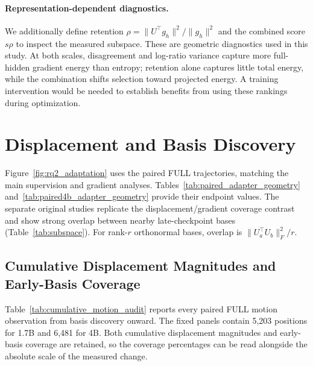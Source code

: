 \paragraph{Representation-dependent diagnostics.}
We additionally define retention $\rho=\|U^\top g_h\|^2/\|g_h\|^2$ and the combined score $s\rho$ to inspect the measured subspace. These are geometric diagnostics used in this study. At both scales, disagreement and log-ratio variance capture more full-hidden gradient energy than entropy; retention alone captures little total energy, while the combination shifts selection toward projected energy. A training intervention would be needed to establish benefits from using these rankings during optimization.




\FloatBarrier
\section{Displacement and Basis Discovery}
\label{app:displacement}
Figure~\ref{fig:rq2_adaptation} uses the paired FULL trajectories, matching the main supervision and gradient analyses. Tables~\ref{tab:paired_adapter_geometry} and~\ref{tab:paired4b_adapter_geometry} provide their endpoint values. The separate original studies replicate the displacement/gradient coverage contrast and show strong overlap between nearby late-checkpoint bases (Table~\ref{tab:subspace}). For rank-$r$ orthonormal bases, overlap is $\|U_a^\top U_b\|_F^2/r$.










\FloatBarrier
\subsection{Cumulative Displacement Magnitudes and Early-Basis Coverage}
\label{app:cumulative_magnitudes}
Table~\ref{tab:cumulative_motion_audit} reports every paired FULL motion observation from basis discovery onward. The fixed panels contain 5,203 positions for 1.7B and 6,481 for 4B. Both cumulative displacement magnitudes and early-basis coverage are retained, so the coverage percentages can be read alongside the absolute scale of the measured change.


